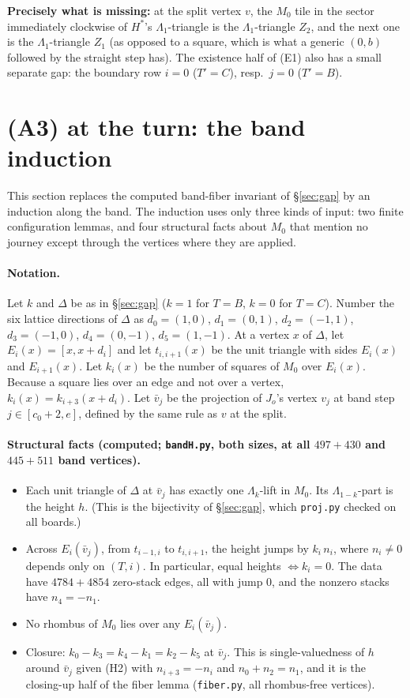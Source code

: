 \documentclass[11pt]{article}
\theoremstyle{definition}\newtheorem{definition}[theorem]{Definition}\newtheorem{remark}[theorem]{Remark}
\begin{document}
\textbf{Precisely what is missing:} at the split vertex $v$, the $M_0$ tile in the sector immediately clockwise of $H^\ast$'s $\Lambda_1$-triangle is the $\Lambda_1$-triangle $Z_2$, and the next one is the $\Lambda_1$-triangle $Z_1$ (as opposed to a square, which is what a generic $(0,b)$ followed by the straight step has). The existence half of (E1) also has a small separate gap: the boundary row $i=0$ ($T'=C$), resp.\ $j=0$ ($T'=B$).

\section{(A3) at the turn: the band induction}\label{sec:band}
This section replaces the computed band-fiber invariant of \S\ref{sec:gap} by an induction along the band. The induction uses only three kinds of input: two finite configuration lemmas, and four structural facts about $M_0$ that mention no journey except through the vertices where they are applied.

\paragraph{Notation.} Let $k$ and $\Delta$ be as in \S\ref{sec:gap} ($k=1$ for $T=B$, $k=0$ for $T=C$). Number the six lattice directions of $\Delta$ as $d_0=(1,0)$, $d_1=(0,1)$, $d_2=(-1,1)$, $d_3=(-1,0)$, $d_4=(0,-1)$, $d_5=(1,-1)$. At a vertex $x$ of $\Delta$, let $E_i(x)=[x,x+d_i]$ and let $t_{i,i+1}(x)$ be the unit triangle with sides $E_i(x)$ and $E_{i+1}(x)$. Let $k_i(x)$ be the number of squares of $M_0$ over $E_i(x)$. Because a square lies over an edge and not over a vertex, $k_i(x)=k_{i+3}(x+d_i)$. Let $\bar v_j$ be the projection of $J_o$'s vertex $v_j$ at band step $j\in[c_0+2,e]$, defined by the same rule as $v$ at the split.

\paragraph{Structural facts (computed; \texttt{bandH.py}, both sizes, at all $497+430$ and $445+511$ band vertices).}
\begin{itemize}
\item[(H1)] Each unit triangle of $\Delta$ at $\bar v_j$ has exactly one $\Lambda_k$-lift in $M_0$. Its $\Lambda_{1-k}$-part is the height $h$. (This is the bijectivity of \S\ref{sec:gap}, which \texttt{proj.py} checked on all boards.)
\item[(H2)] Across $E_i(\bar v_j)$, from $t_{i-1,i}$ to $t_{i,i+1}$, the height jumps by $k_i\,n_i$, where $n_i\ne0$ depends only on $(T,i)$. In particular, equal heights $\iff k_i=0$. The data have $4784+4854$ zero-stack edges, all with jump $0$, and the nonzero stacks have $n_4=-n_1$.
\item[(H3)] No rhombus of $M_0$ lies over any $E_i(\bar v_j)$.
\item[(Cl)] Closure: $k_0-k_3=k_4-k_1=k_2-k_5$ at $\bar v_j$. This is single-valuedness of $h$ around $\bar v_j$ given (H2) with $n_{i+3}=-n_i$ and $n_0+n_2=n_1$, and it is the closing-up half of the fiber lemma (\texttt{fiber.py}, all rhombus-free vertices).
\end{itemize}
\end{document}
